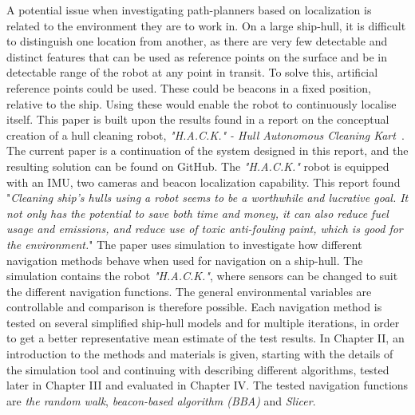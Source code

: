 A potential issue when investigating path-planners based on localization is related to the environment they are to work in. On a large ship-hull, it is difficult to distinguish one location from another, as there are very few detectable and distinct features that can be used as reference points on the surface and be in detectable range of the robot at any point in transit.
To solve this, artificial reference points could be used. These could be beacons in a fixed position, relative to the ship. Using these would enable the robot to continuously localise itself.
This paper is built upon the results found in a report on the conceptual creation of a hull cleaning robot, \textit{"H.A.C.K." - Hull Autonomous Cleaning Kart}~\cite{P6-report}. The current paper is a continuation of the system designed in this report, and the resulting solution can be found on GitHub\cite{ProjectGithub}.
The \textit{"H.A.C.K."} robot is equipped with an IMU, two cameras and beacon localization capability.
This report found "\textit{Cleaning ship’s hulls using a robot seems to be a worthwhile and lucrative goal. It not
only has the potential to save both time and money, it can also reduce fuel usage and
emissions, and reduce use of toxic anti-fouling paint, which is good for the environment.}"
The paper uses simulation to investigate how different navigation methods behave when used for navigation on a ship-hull. The simulation contains the robot \textit{"H.A.C.K."}, where sensors can be changed to suit the different navigation functions. The general environmental variables are controllable and comparison is therefore possible. 
Each navigation method is tested on several simplified ship-hull models and for multiple iterations, in order to get a better representative mean estimate of the test results. In Chapter II, an introduction to the methods and materials is given, starting with the details of the simulation tool and continuing with describing different algorithms, tested later in Chapter III and evaluated in Chapter IV.  The tested navigation functions are \textit{the random walk}, \textit{beacon-based algorithm (BBA)} and \textit{Slicer}. 




